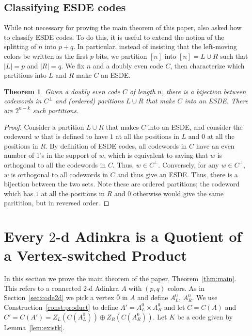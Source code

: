 \documentclass[12pt,twoside,singlespace]{article}
\numberwithin{equation}{section}
\newtheorem{thm}[equation]{Theorem}
\theoremstyle{definition}
\begin{document}
\subsection{Classifying ESDE codes}
While not necessary for proving the main theorem of this paper, \cite{hubsch:weaving} also asked how to classify ESDE codes.  To do this, it is useful to extend the notion of the splitting of $n$ into $p+q$.  In particular, instead of insisting that the left-moving colors be written as the first $p$ bits, we partition $[n]$ into $[n]=L\cup R$ such that $|L|=p$ and $|R|=q$.  We fix $n$ and a doubly even code $C$, then characterize which partitions into $L$ and $R$ make $C$ an ESDE.

\begin{thm}
\label{thm:esde}
Given a doubly even code $C$ of length $n$, there is a bijection between codewords in $C^\perp$ and (ordered) paritions $L \cup R$ that make $C$ into an ESDE. There are $2^{n-k}$ such partitions. 
\end{thm}
\begin{proof}
Consider a partition $L \cup R$ that makes $C$ into an ESDE, and consider the codeword $w$ that is defined to have $1$ at all the positions in $L$ and $0$ at all the positions in $R$.  By definition of ESDE codes, all codewords in $C$ have an even number of $1$'s in the support of $w$, which is equivalent to saying that $w$ is orthogonal to all the codewords in $C$. Thus, $w \in C^\perp$.  Conversely, for any $w \in C^\perp$, $w$ is orthogonal to all codewords in $C$ and thus give an ESDE. Thus, there is a bijection between the two sets.  Note these are ordered partitions; the codeword which has $1$ at all the positions in $R$ and $0$ otherwise would give the same paritition, but in reversed order.
\end{proof}

\section{Every $2$-d Adinkra is a Quotient of a Vertex-switched Product}
\label{sec:quotient}
In this section we prove the main theorem of the paper, Theorem~\ref{thm:main}.  This refers to a connected $2$-d Adinkra $A$ with $(p,q)$ colors.  As in Section~\ref{sec:code2d} we pick a vertex $\overline{0}$ in $A$ and define $A_L^0$, $A_R^0$.  We use Construction~\ref{const:product} to define $A'=A_L^0\times A_R^0$ and let $C=C(A)$ and $C'=C(A')=Z_L(C(A_L^0))\oplus Z_R(C(A_R^0))$.  Let $K$ be a code given by Lemma~\ref{lem:existk}.
\end{document}
